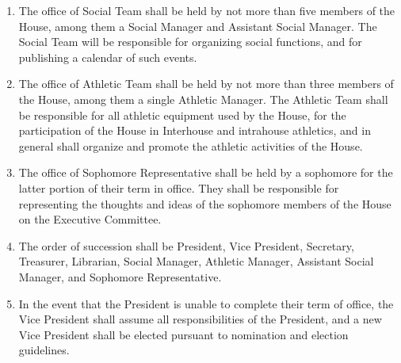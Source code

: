 \documentclass[10pt]{article} %
\begin{document}
\begin{enumerate}
\item The office of Social Team shall be held by not more than five members of the House, among them a Social Manager and Assistant Social Manager. The Social Team will be responsible for organizing social functions, and for publishing a calendar of such events.
\item The office of Athletic Team shall be held by not more than three members of the House, among them a single Athletic Manager. The Athletic Team shall be responsible for all athletic equipment used by the House, for the participation of the House in Interhouse and intrahouse athletics, and in general shall organize and promote the athletic activities of the House.
\item The office of Sophomore Representative shall be held by a sophomore for the latter portion of their term in office. They shall be responsible for representing the thoughts and ideas of the sophomore members of the House on the Executive Committee.
\item The order of succession shall be President, Vice President, Secretary, Treasurer, Librarian, Social Manager, Athletic Manager, Assistant Social Manager, and Sophomore Representative.
\item \label{PrezSuccession} In the event that the President is unable to complete their term of office, the Vice President shall assume all responsibilities of the President, and a new Vice President shall be elected pursuant to nomination and election guidelines.
\end{enumerate}
\end{document}
